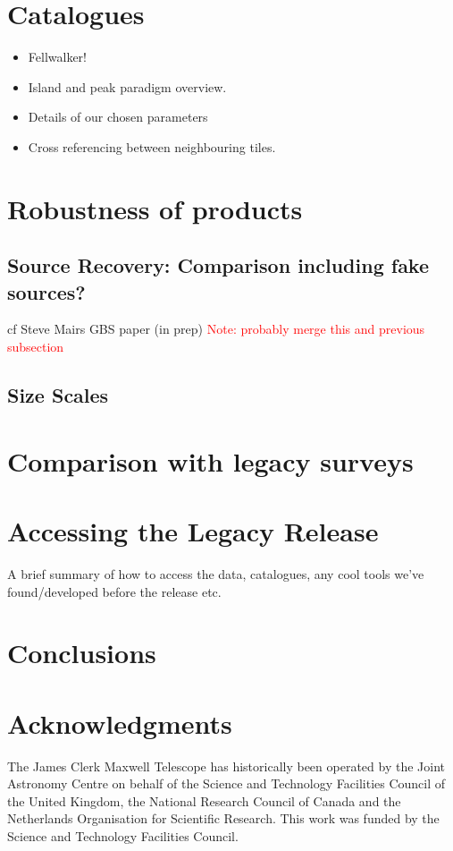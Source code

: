 \documentclass[usenatbib]{mn2e}
\newcommand{\note}[1]{\textcolor{red}{Note: #1}}
\begin{document}
\section{Catalogues}
\begin{itemize}
\item Fellwalker! \citep{2015A&C....10...22B}
\item Island and peak paradigm overview.
\item Details of our chosen parameters
\item Cross referencing between neighbouring tiles.
\end{itemize}


\section{Robustness of products}

\subsection{Source Recovery: Comparison including fake sources?}
cf Steve Mairs GBS paper (in prep)
\note{ probably merge this and previous subsection}

\subsection{Size Scales}

\section{Comparison with legacy surveys}

\section{Accessing the Legacy Release}
A brief summary of how to access the data, catalogues, any cool tools
we've found/developed before the release etc.

\section{Conclusions}

\section*{Acknowledgments}

The James Clerk Maxwell Telescope has historically been operated by
the Joint Astronomy Centre on behalf of the Science and Technology
Facilities Council of the United Kingdom, the National Research
Council of Canada and the Netherlands Organisation for Scientific
Research. This work was funded by the Science and Technology Facilities
Council.
\end{document}
